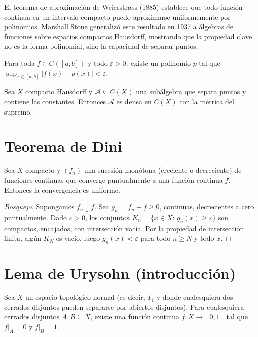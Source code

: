 El teorema de aproximación de Weierstrass (1885) establece que todo función continua en un intervalo compacto puede aproximarse uniformemente por polinomios. Marshall Stone generalizó este resultado en 1937 a álgebras de funciones sobre espacios compactos Hausdorff, mostrando que la propiedad clave no es la forma polinomial, sino la capacidad de separar puntos.

\begin{theorem}
\label{teo:weierstrass}
Para toda $f\in C([a,b])$ y todo $\varepsilon>0$, existe un polinomio $p$ tal que $\sup_{x\in[a,b]}|f(x)-p(x)|<\varepsilon$.
\end{theorem}

\begin{theorem}
\label{teo:stone-weierstrass-enunciado}
Sea $X$ compacto Hausdorff y $\mathcal{A}\subseteq C(X)$ una subálgebra que separa puntos y contiene las constantes. Entonces $\mathcal{A}$ es densa en $C(X)$ con la métrica del supremo.
\end{theorem}

\section{Teorema de Dini}

\begin{theorem}[Dini]
\label{teo:dini}
Sea $X$ compacto y $(f_n)$ una sucesión monótona (creciente o decreciente) de funciones continuas que converge puntualmente a una función continua $f$. Entonces la convergencia es uniforme.
\end{theorem}
\begin{proof}[Bosquejo]
Supongamos $f_n\downarrow f$. Sea $g_n=f_n-f\geq 0$, continuas, decrecientes a cero puntualmente. Dado $\varepsilon>0$, los conjuntos $K_n=\{x\in X:\,g_n(x)\geq\varepsilon\}$ son compactos, encajados, con intersección vacía. Por la propiedad de intersección finita, algún $K_N$ es vacío, luego $g_n(x)<\varepsilon$ para todo $n\geq N$ y todo $x$.
\end{proof}

\section{Lema de Urysohn (introducción)}

\begin{theorem}
\label{teo:urysohn}
Sea $X$ un espacio topológico normal (es decir, $T_1$ y donde cualesquiera dos cerrados disjuntos pueden separarse por abiertos disjuntos). Para cualesquiera cerrados disjuntos $A,B\subseteq X$, existe una función continua $f\colon X\to[0,1]$ tal que $f|_A=0$ y $f|_B=1$.
\end{theorem}

